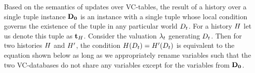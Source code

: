 %

Based on the semantics of updates over VC-tables, the result of a history over a single tuple instance $\mathbf{D_0}$ is an instance with a single tuple whose local condition governs the existence of the tuple in any particular world $D_{t}$. For a history $H$ let us denote this tuple as $\mathbf{t}_{H}$. Consider the valuation $\lambda_{t}$ generating $D_{t}$. Then for two histories $H$ and $H'$, the condition $H(D_{t}) = H'(D_{t})$ is equivalent to the equation shown below as long as we appropriately rename variables such that the two VC-databases do not share any variables except for the variables from $\mathbf{D_0}$. %

